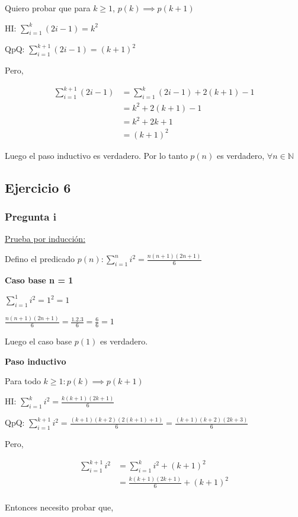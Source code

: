 Quiero probar que para $k \geq 1$, $p(k) \implies p(k+1)$

HI: $\sum_{i=1}^{k}(2i-1) = k^2$

QpQ: $\sum_{i=1}^{k+1}(2i-1) = (k+1)^2$

Pero,

\begin{align*}
    \sum_{i=1}^{k+1}(2i-1) &= \sum_{i=1}^{k}(2i-1) + 2(k+1)-1 \\
    &= k^2 + 2(k+1)-1 \\
    &= k^2 + 2k+1 \\
    &= (k+1)^2
\end{align*}

Luego el paso inductivo es verdadero. Por lo tanto $p(n)$ es verdadero, $\forall n \in \mathbb{N}$

\subsection{Ejercicio 6}

\subsubsection{Pregunta i}

\underline{Prueba por inducción:}

Defino el predicado $p(n) : \sum_{i=1}^{n}i^2 = \frac{n(n+1)(2n+1)}{6}$

\textbf{Caso base n = 1}

$\sum_{i=1}^{1}i^2 = 1^2 = 1$

$\frac{n(n+1)(2n+1)}{6} = \frac{1.2.3}{6} = \frac{6}{6} = 1$

Luego el caso base $p(1)$ es verdadero.

\textbf{Paso inductivo}

Para todo $k \geq 1: p(k) \implies p(k+1)$

HI: $\sum_{i=1}^{k}i^2 =  \frac{k(k+1)(2k+1)}{6}$

QpQ: $\sum_{i=1}^{k+1}i^2 =  \frac{(k+1)(k+2)(2(k+1)+1)}{6} =  \frac{(k+1)(k+2)(2k+3)}{6}$

Pero,

\begin{align*}
    \sum_{i=1}^{k+1}i^2 &= \sum_{i=1}^{k}i^2 + (k+1)^2 \\
    &= \frac{k(k+1)(2k+1)}{6} + (k+1)^2 \\
\end{align*}

Entonces necesito probar que, 

